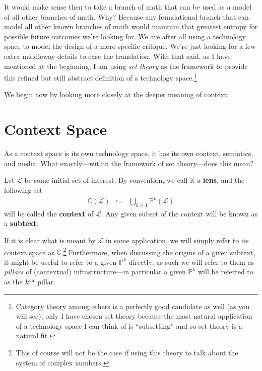\documentclass[twoside]{article}
\newenvironment{definition}[1][Definition]{\begin{trivlist}
\item[\hskip \labelsep {\bfseries #1:}]}{\end{trivlist}}
\begin{document}
It would make sense then to take a branch of math that can be used as a model of all other branches of math. Why? Because any
foundational branch that can model all other known branches of math would maintain that greatest entropy for possible future
outcomes we're looking for. We are after all using a technology space to model the design of a more specific critique. We're
just looking for a few extra middleway details to ease the translation.  With that said, as I have mentioned at the beginning,
I am using \emph{set theory} as the framework to provide this refined but still abstract definition of a technology
space.\footnote{Category theory among others is a perfectly good candidate as well (as you will see), only I have
chosen set theory because the most natural application of a technology space I can think of is ``subsetting''
and so set theory is a natural fit.}

We begin now by looking more closely at the deeper meaning of context:

\section*{Context Space}

As a context space is its own technology space, it has its own context, semiotics, and media. What exactly---within the
framework of set theory---does this mean?

\begin{definition}[Context Space - Context]

Let $ \mathcal{L} $ be some initial set of interest. By convention, we call it a {\bfseries lens}, and the following set
\begin{eqnarray*}
\mathbb{C}(\mathcal{L}) & := & \bigcup_{k\ge 1}\mathbb{P}^k(\mathcal{L})
\end{eqnarray*}
will be called the {\bfseries context} of $ \mathcal{L} $. Any given subset of the context will be known as a {\bfseries subtext}.

\end{definition}

If it is clear what is meant by $ \mathcal{L} $ in some application, we will simply refer to its context space as
$ \mathbb{C} $.\footnote{This of course will not be the case if using this theory to talk about the system of complex numbers.}
Furthermore, when discussing the origins of a given subtext, it might be useful to refer to a given $ \mathbb{P}^k $ directly;
as such we will refer to them as \emph{pillars} of (contextual) infrastructure---in particular a given $ \mathbb{P}^k $ will
be referred to as the $ k^{\scriptsize \mbox{th}} $ pillar.
\end{document}
